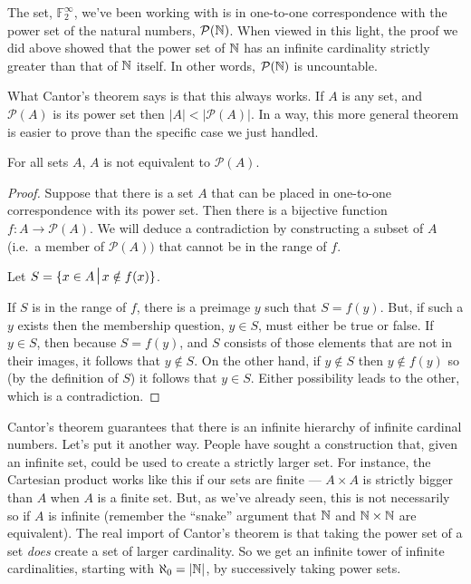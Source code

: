 The set, ${\mathbb F}_2^\infty$, we've been working with is in one-to-one correspondence
with the power set of the natural numbers, ${\mathcal P}({\mathbb N})$.  
When viewed in this light, the proof we did above showed that the power 
set of ${\mathbb N}$ has an infinite cardinality strictly greater than that 
of ${\mathbb N}$ itself.  In other words, ${\mathcal P}({\mathbb N})$ is
uncountable.

What Cantor's theorem says is that this always works.  If $A$ is any set,
and ${\mathcal P}(A)$ is its power set then $|A| < |{\mathcal P}(A)|$. 
In a way, this more general
theorem is easier to prove than the specific case we just handled.

\begin{thm}[Cantor]  
For all sets $A$, $A$ is not equivalent to ${\mathcal P}(A)$.
\end{thm}

\begin{proof}
Suppose that there is a set $A$ that can be placed in one-to-one
correspondence with its power set.  Then there is a bijective
function $f : A \longrightarrow {\mathcal P}(A)$.  We will deduce 
a contradiction by constructing a subset of $A$ 
(i.e.\ a member of ${\mathcal P}(A))$ that cannot
be in the range of $f$.

Let $S = \{x \in A \suchthat x \notin f(x)\}$.

If $S$ is in the range of $f$, there is a preimage $y$ such that $S = f(y)$.
But, if such a $y$ exists then the membership question, $y \in S$, must
either be true or false.   If $y \in S$,  then because $S = f(y)$, and $S$
consists of those elements that are not in their images, it follows
that $y \notin S$.  On the other hand, if $y \notin S$ then $y \notin f(y)$ so 
(by the definition of $S$) it follows that $y \in S$.  Either possibility leads to the other, which is a contradiction.
\end{proof}

Cantor's theorem guarantees that there is an infinite hierarchy of infinite
cardinal numbers.  Let's put it another way.  People have sought a construction
that, given an infinite set, could be used to create a strictly larger set.  
For
instance, the Cartesian product works like this if our sets are finite --- 
$A \times A$ is strictly bigger than $A$ when $A$ is a finite set.  But, as 
we've already seen,
this is not necessarily so if $A$ is infinite (remember the ``snake'' argument
that ${\mathbb N}$ and ${\mathbb N} \times {\mathbb N}$ are equivalent).  The 
real import of Cantor's theorem is that taking the power set of a set 
\emph{does} create a set of larger cardinality.
So we get an infinite tower of infinite cardinalities, starting with 
$\aleph_0 = |{\mathbb N}|$, by successively taking power sets.

